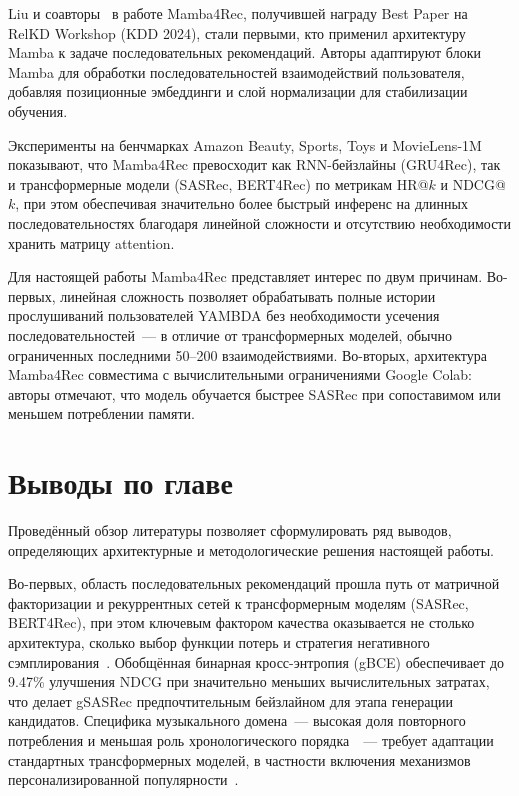Liu и соавторы~\cite{liu2024mamba4rec} в работе Mamba4Rec, получившей награду Best Paper на RelKD Workshop (KDD 2024), стали первыми, кто применил архитектуру Mamba к задаче последовательных рекомендаций. Авторы адаптируют блоки Mamba для обработки последовательностей взаимодействий пользователя, добавляя позиционные эмбеддинги и слой нормализации для стабилизации обучения.

Эксперименты на бенчмарках Amazon Beauty, Sports, Toys и MovieLens-1M показывают, что Mamba4Rec превосходит как RNN-бейзлайны (GRU4Rec), так и трансформерные модели (SASRec, BERT4Rec) по метрикам HR@$k$ и NDCG@$k$, при этом обеспечивая значительно более быстрый инференс на длинных последовательностях благодаря линейной сложности и отсутствию необходимости хранить матрицу attention.

Для настоящей работы Mamba4Rec представляет интерес по двум причинам. Во-первых, линейная сложность позволяет обрабатывать полные истории прослушиваний пользователей YAMBDA без необходимости усечения последовательностей~--- в отличие от трансформерных моделей, обычно ограниченных последними 50--200 взаимодействиями. Во-вторых, архитектура Mamba4Rec совместима с вычислительными ограничениями Google Colab: авторы отмечают, что модель обучается быстрее SASRec при сопоставимом или меньшем потреблении памяти.

\section{Выводы по главе}

Проведённый обзор литературы позволяет сформулировать ряд выводов, определяющих архитектурные и методологические решения настоящей работы.

Во-первых, область последовательных рекомендаций прошла путь от матричной факторизации и рекуррентных сетей к трансформерным моделям (SASRec, BERT4Rec), при этом ключевым фактором качества оказывается не столько архитектура, сколько выбор функции потерь и стратегия негативного сэмплирования~\cite{gsasrec2023}. Обобщённая бинарная кросс-энтропия (gBCE) обеспечивает до 9.47\% улучшения NDCG при значительно меньших вычислительных затратах, что делает gSASRec предпочтительным бейзлайном для этапа генерации кандидатов. Специфика музыкального домена~--- высокая доля повторного потребления и меньшая роль хронологического порядка~\cite{greer2025beyond}~--- требует адаптации стандартных трансформерных моделей, в частности включения механизмов персонализированной популярности~\cite{abbattista2024sequential}.

